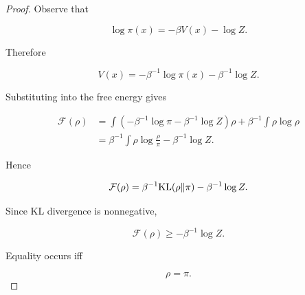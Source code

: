 \begin{proof}

Observe that

\[
\log \pi(x)
=
-\beta V(x)-\log Z.
\]

Therefore

\[
V(x)
=
-\beta^{-1}\log\pi(x)
-\beta^{-1}\log Z.
\]

Substituting into the free energy gives

\begin{align*}
\mathcal F(\rho)
&=
\int
\left(
-\beta^{-1}\log\pi
-\beta^{-1}\log Z
\right)
\rho
+
\beta^{-1}
\int
\rho\log\rho
\\
&=
\beta^{-1}
\int
\rho
\log
\frac{\rho}{\pi}
-
\beta^{-1}\log Z.
\end{align*}

Hence

\[
\mathcal F(\rho)
=
\beta^{-1}
\mathrm{KL}(\rho\|\pi)
-
\beta^{-1}\log Z.
\]

Since KL divergence is nonnegative,

\[
\mathcal F(\rho)
\ge
-\beta^{-1}\log Z.
\]

Equality occurs iff

\[
\rho=\pi.
\]

\end{proof}
